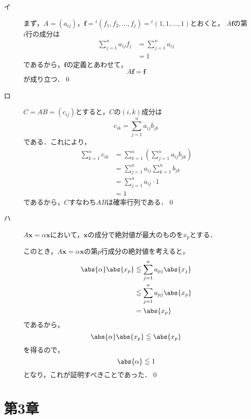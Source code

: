 \documentclass[uplatex,dvipdfmx,a4paper,10pt,fleqn]{jsarticle}
\begin{document}
\begin{leftbar}
    \begin{description}
        \item[イ] まず，$A=(a_{ij})$，$\bm{f} = {}^t (f_1 , f_2,\dots,f_j) ={}^t (1,1,\dots,1)$とおくと，
        $A \bm{f}$の第$i$行の成分は
        \begin{align*}
            \sum_{j=1}^{n} a_{ij} f_j &= \sum_{j=1}^{n} a_{ij} \\
            &=1 
        \end{align*}
        であるから，$\bm{f}$の定義とあわせて，
        \[
            A \bm{f} =\bm{f}
        \]
        が成り立つ．\qed 
        \item[ロ] $C =AB=(c_{ij})$とすると，$C$の$(i,k)$成分は
        \[
            c_{ik}  =\sum_{j=1}^{n} a_{ij} b_{jk}
        \]
        である．これにより，
        \begin{align*} 
            \sum_{k=1}^{n} c_{ik} & = \sum_{k=1}^{n} \left (\sum_{j=1}^{n} a_{ij} b_{jk}\right) \\
            & = \sum_{j=1}^{n} a_{ij} \sum_{k=1}^{n} b_{jk} \\
            & = \sum_{j=1}^{n} a_{ij} \cdot 1 \\
            & = 1
        \end{align*} 
        であるから，$C$すなわち$AB$は確率行列である．\qed
        \item[ハ] $ A \bm{x}=\alpha \bm{x}$において，$\bm{x}$の成分で絶対値が最大のものを$x_p$とする．
    
        このとき，$ A \bm{x} = \alpha \bm{x}$の第$p$行成分の絶対値を考えると，
        \begin{align*} 
            \abs{\alpha} \abs{x_p} &\leqq \sum_{j=1}^{n} a_{pj} \abs{x_j} \\
            & \leqq \sum_{j=1}^{n} a_{pj} \abs{x_p} \\
            & = \abs{x_p}
        \end{align*} 
        であるから，
        \[
            \abs{\alpha} \abs{x_p} \leqq \abs{x_p}
        \]
        を得るので，
        \[
            \abs{\alpha} \leqq 1
        \]
        となり，これが証明すべきことであった．\qed
        \end{description}
    \end{leftbar}

    \newpage 


\section*{第3章}
\end{document}
